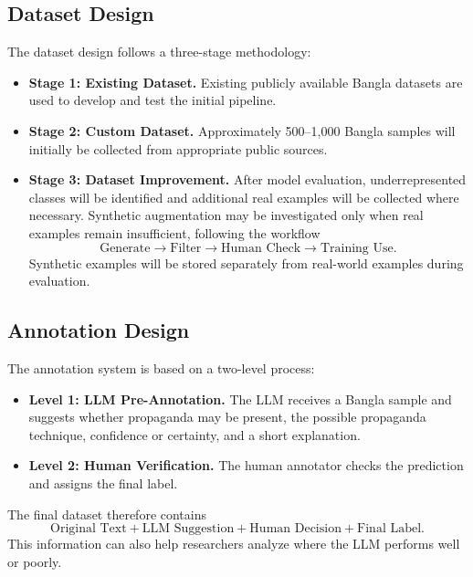 \subsection{Dataset Design}
The dataset design follows a three-stage methodology:
\begin{itemize}
  \item \textbf{Stage 1: Existing Dataset.} Existing publicly available Bangla
        datasets are used to develop and test the initial pipeline.
  \item \textbf{Stage 2: Custom Dataset.} Approximately 500--1,000 Bangla samples
        will initially be collected from appropriate public sources.
  \item \textbf{Stage 3: Dataset Improvement.} After model evaluation,
        underrepresented classes will be identified and additional real examples
        will be collected where necessary. Synthetic augmentation may be
        investigated only when real examples remain insufficient, following the
        workflow
        \[\text{Generate}\rightarrow\text{Filter}\rightarrow\text{Human Check}\rightarrow\text{Training Use}.\]
        Synthetic examples will be stored separately from real-world examples
        during evaluation.
\end{itemize}

\subsection{Annotation Design}
The annotation system is based on a two-level process:
\begin{itemize}
  \item \textbf{Level 1: LLM Pre-Annotation.} The LLM receives a Bangla sample and
        suggests whether propaganda may be present, the possible propaganda
        technique, confidence or certainty, and a short explanation.
  \item \textbf{Level 2: Human Verification.} The human annotator checks the
        prediction and assigns the final label.
\end{itemize}
The final dataset therefore contains
\[\text{Original Text}+\text{LLM Suggestion}+\text{Human Decision}+\text{Final Label}.\]
This information can also help researchers analyze where the LLM performs well or
poorly.

